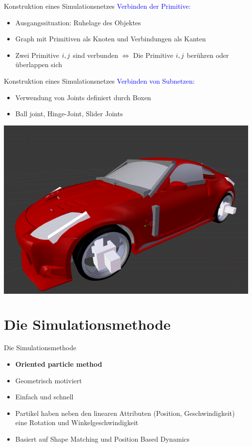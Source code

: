 \documentclass[t]{beamer}
\begin{document}
	\begin{frame}{Konstruktion eines Simulationsnetzes}
		\textcolor{blue}{Verbinden der Primitive:}
		\begin{itemize}
			\item Ausgangssituation: Ruhelage des Objektes
			\item Graph mit Primitiven als Knoten und Verbindungen als Kanten
			\item Zwei Primitive $\mathnormal{i,j}$ sind verbunden $\Leftrightarrow$ Die Primitive $\mathnormal{i,j}$ berühren oder überlappen sich
		\end{itemize}
	\end{frame}

	\begin{frame}{Konstruktion eines Simulationsnetzes}
		\textcolor{blue}{Verbinden von Subnetzen:}
		\begin{itemize}
			\item Verwendung von Joints definiert durch Boxen
			\item Ball joint, Hinge-Joint, Slider Joints
		\end{itemize}
		\vfill
		\centering
		\includegraphics[scale = 0.3]{Joints.png}
	\end{frame}
	
	\section{Die Simulationsmethode}
	\begin{frame}{Die Simulationsmethode}
		\begin{itemize}
			\item \textbf{Oriented particle method}
			\item Geometrisch motiviert
			\item Einfach und schnell
			\item Partikel haben neben den linearen Attributen (Position, Geschwindigkeit) eine Rotation und Winkelgeschwindigkeit
			\item Basiert auf Shape Matching und Position Based Dynamics
		\end{itemize}
	\end{frame}	
	
\end{document}
